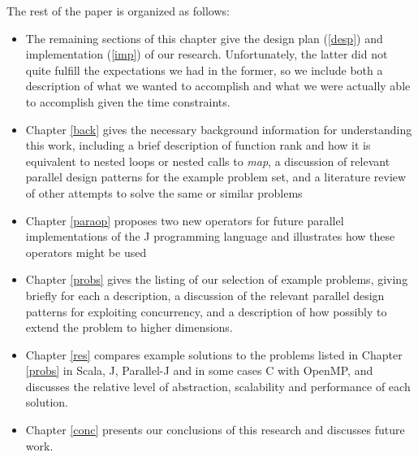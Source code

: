 The rest of the paper is organized as follows:
\begin{itemize} 
	\item The remaining sections of this chapter give the design plan (\ref{desp}) and implementation (\ref{imp}) of our research. 
	Unfortunately, the latter did not quite fulfill the expectations we had in the former, so we include both a description of what we wanted to accomplish and what we were actually able to accomplish given the time constraints. 
	\item Chapter \ref{back} gives the necessary background information for understanding this work, 
	including a brief description of function rank and how it is equivalent to nested loops or nested calls to \textit{map},
	a discussion of relevant parallel design patterns for the example problem set, 
	and a literature review of other attempts to solve the same or similar problems
	\item Chapter \ref{paraop} proposes two new operators for future parallel implementations of the J programming language 
		and illustrates how these operators might be used
    \item Chapter \ref{probs} gives the listing of our selection of example problems, giving briefly for each a description, a discussion of the relevant parallel design patterns for exploiting concurrency, and a description of how possibly to extend the problem to higher dimensions.
    \item Chapter \ref{res} compares example solutions to the problems listed in Chapter \ref{probs} in Scala, J, Parallel-J and in some cases C with OpenMP, and discusses the relative level of abstraction, scalability and performance of each solution. %
    \item Chapter \ref{conc} presents our conclusions of this research and discusses future work. 
\end{itemize}

